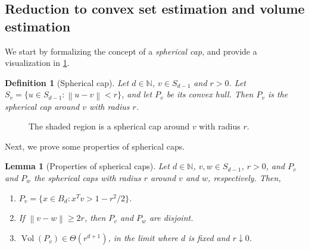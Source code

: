 \documentclass[11pt]{article}
\newtheorem{definition}[theorem]{Definition}
\newtheorem{lemma}[theorem]{Lemma}
\newcommand{\N}{\ensuremath{\mathbb{N}}}
\newcommand{\norm}[1]{\ensuremath{\left\|#1\right\|}}
\DeclareMathOperator{\Vol}{Vol}
\begin{document}
    \subsection{Reduction to convex set estimation and volume estimation}
    \label{subsec:reductions}

    We start by formalizing the concept of a \textit{spherical cap}, and provide a visualization in \cref{fig:delta-patch}.

    \begin{definition}[Spherical cap]
        Let $d \in \N$, $v \in S_{d-1}$ and $r > 0$. Let $S_v = \{u \in S_{d-1} : \norm{u-v} < r\}$, and let $P_v$ be its convex hull. Then $P_v$ is the spherical cap around $v$ with radius $r$.
    \end{definition}

    \begin{figure}[!ht]
        \centering
        \caption{The shaded region is a spherical cap around $v$ with radius $r$.}
        \label{fig:delta-patch}
    \end{figure}

    Next, we prove some properties of spherical caps.

    \begin{lemma}[Properties of spherical caps]
        \label{lem:spherical-patches-properties}
        Let $d \in \N$, $v,w \in S_{d-1}$, $r > 0$, and $P_v$ and $P_w$ the spherical caps with radius $r$ around $v$ and $w$, respectively. Then,
        \begin{enumerate}[nosep]
            \item $P_v = \{x \in B_d : x^Tv > 1-r^2/2\}$.
            \item If $\norm{v-w} \geq 2r$, then $P_v$ and $P_w$ are disjoint.
            \item $\Vol(P_v) \in \Theta(r^{d+1})$, in the limit where $d$ is fixed and $r \downarrow 0$.
        \end{enumerate}
    \end{lemma}
\end{document}
